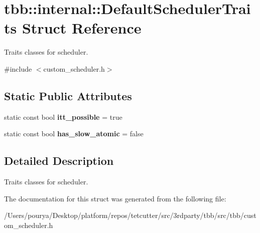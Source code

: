 \hypertarget{structtbb_1_1internal_1_1DefaultSchedulerTraits}{}\section{tbb\+:\+:internal\+:\+:Default\+Scheduler\+Traits Struct Reference}
\label{structtbb_1_1internal_1_1DefaultSchedulerTraits}


Traits classes for scheduler.  




{\ttfamily \#include $<$custom\+\_\+scheduler.\+h$>$}

\subsection*{Static Public Attributes}
\begin{DoxyCompactItemize}
\item 
\hypertarget{structtbb_1_1internal_1_1DefaultSchedulerTraits_a1bb59c3b985e97bcc2c822e3ca4ac6a2}{}static const bool {\bfseries itt\+\_\+possible} = true\label{structtbb_1_1internal_1_1DefaultSchedulerTraits_a1bb59c3b985e97bcc2c822e3ca4ac6a2}

\item 
\hypertarget{structtbb_1_1internal_1_1DefaultSchedulerTraits_a709308e4996d6a3025ec7679e4feab09}{}static const bool {\bfseries has\+\_\+slow\+\_\+atomic} = false\label{structtbb_1_1internal_1_1DefaultSchedulerTraits_a709308e4996d6a3025ec7679e4feab09}

\end{DoxyCompactItemize}


\subsection{Detailed Description}
Traits classes for scheduler. 

The documentation for this struct was generated from the following file\+:\begin{DoxyCompactItemize}
\item 
/\+Users/pourya/\+Desktop/platform/repos/tetcutter/src/3rdparty/tbb/src/tbb/custom\+\_\+scheduler.\+h\end{DoxyCompactItemize}
